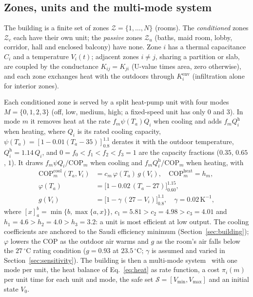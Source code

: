 \documentclass[10pt,a4paper,twocolumn]{article}
\theoremstyle{definition}
\begin{document}
\subsection{Zones, units and the multi-mode system}\label{sec:prelim}
The building is a finite set of zones $\mathcal{Z}=\{1,\dots,N\}$ (rooms). The \emph{conditioned} zones $\mathcal{Z}_c$ each have their own unit; the \emph{passive} zones $\mathcal{Z}_u$ (baths, maid room, lobby, corridor, hall and enclosed balcony) have none. Zone $i$ has a thermal capacitance $C_i$ and a temperature $V_i(t)$; adjacent zones $i\ne j$, sharing a partition or slab, are coupled by the conductance $K_{ij}=K_{ji}$ (U-value times area, zero otherwise), and each zone exchanges heat with the outdoors through $K^{\mathrm{env}}_i$ (infiltration alone for interior zones).

Each conditioned zone is served by a split heat-pump unit with four modes $M=\{0,1,2,3\}$ (off, low, medium, high; a fixed-speed unit has only $0$ and $3$). In mode $m$ it removes heat at the rate $f_m\psi(T_a)Q_i$ when cooling and adds $f_mQ^{\mathrm{h}}_i$ when heating, where $Q_i$ is its rated cooling capacity, $\psi(T_a)=[1-0.01(T_a-35)]_{0.8}^{1.1}$ derates it with the outdoor temperature, $Q^{\mathrm{h}}_i=1.14\,Q_i$, and $0=f_0<f_1<f_2<f_3=1$ are the capacity fractions ($0.35$, $0.65$, $1$). It draws $f_m\psi Q_i/\mathrm{COP}_m$ when cooling and $f_mQ^{\mathrm{h}}_i/\mathrm{COP}_m$ when heating, with
\begin{subequations}\label{eq:cop}
\begin{align}
\mathrm{COP}^{\text{cool}}_m(T_a,V_i)&=c_m\,\varphi(T_a)\,g(V_i),\quad \mathrm{COP}^{\text{heat}}_m=h_m,\\
\varphi(T_a)&=\bigl[1-0.02\,(T_a-27)\bigr]_{0.60}^{1.15},\\
g(V_i)&=\bigl[1-\gamma\,(27-V_i)\bigr]_{0.8}^{1.1},\quad \gamma=0.02\,\text{K}^{-1},
\end{align}
\end{subequations}
where $[x]_a^b=\min\{b,\max\{a,x\}\}$, $c_1=5.81>c_2=4.98>c_3=4.01$ and $h_1=4.6>h_2=4.0>h_3=3.2$: a unit is most efficient at low output. The cooling coefficients are anchored to the Saudi efficiency minimum (Section~\ref{sec:building}); $\varphi$ lowers the COP as the outdoor air warms and $g$ as the room's air falls below the $27\,^{\circ}$C rating condition ($g=0.93$ at $23.5\,^{\circ}$C; $\gamma$ is assumed and varied in Section~\ref{sec:sensitivity}). The building is then a multi-mode system~\citep{mousa2017optimal} with one mode per unit, the heat balance of Eq.~\eqref{eq:heat} as rate function, a cost $\pi_i(m)$ per unit time for each unit and mode, the safe set $\mathcal{S}=[V_{\min},V_{\max}]$ and an initial state $V_0$.
\end{document}
